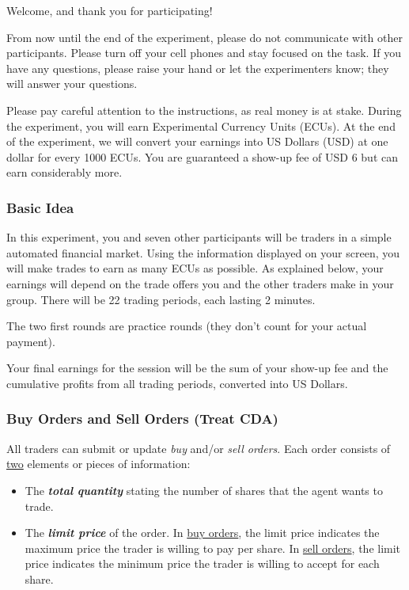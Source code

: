 \documentclass[12pt]{article}
\begin{document}
\begin{singlespace}
Welcome, and thank you for participating!

From now until the end of the experiment, please do not communicate with
other participants. Please turn off your cell phones and stay focused on
the task. If you have any questions, please raise your hand or let the
experimenters know; they will answer your questions.

Please pay careful attention to the instructions, as real money is at
stake. During the experiment, you will earn Experimental Currency Units
(ECUs). At the end of the experiment, we will convert your earnings into
US Dollars (USD) at one dollar for every 1000 ECUs. You are guaranteed a
show-up fee of USD 6 but can earn considerably more.

\subsubsection*{Basic Idea}\label{basic-idea_cda}

In this experiment, you and seven other participants will be traders in
a simple automated financial market. Using the information displayed on
your screen, you will make trades to earn as many ECUs as possible. As
explained below, your earnings will depend on the trade offers you and
the other traders make in your group. There will be 22 trading periods,
each lasting 2 minutes.

The two first rounds are practice rounds (they don't count for your actual payment).

Your final earnings for the session will be the sum of your show-up fee
and the cumulative profits from all trading periods, converted into US
Dollars.

\subsubsection*{Buy Orders and Sell Orders (Treat
CDA)}\label{buy-orders-and-sell-orders-treat-cda}

All traders can submit or update \emph{buy} and/or \emph{sell orders}.
Each order consists of \ul{two} elements or pieces of information:

\begin{itemize}
\item
  The \emph{\textbf{total quantity}} stating the number of shares that
  the agent wants to trade.
\item
  The \emph{\textbf{limit price}} of the order. In \ul{buy orders}, the
  limit price indicates the maximum price the trader is willing to pay
  per share. In \ul{sell orders}, the limit price indicates the minimum
  price the trader is willing to accept for each share.
\end{itemize}


\end{singlespace}
\end{document}
